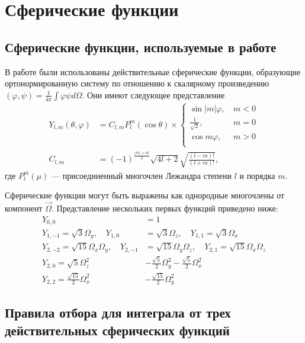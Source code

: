 \chapter{Сферические функции}
\label{chap:spher}

\section{Сферические функции, используемые в работе}

В работе были использованы действительные сферические функции, образующие ортонормированную систему по отношению
к скалярному произведению $(\varphi, \psi) = \frac{1}{4\pi} \int \varphi \psi d\Omega$. Они имеют следующее представление
\begin{align*}
Y_{l,m}(\theta, \varphi) &= C_{l,m}P_l^{m}(\cos \theta)\times
\begin{cases}
\sin |m| \varphi,&\, m<0\\
\frac{1}{\sqrt{2}},&\, m=0\\
\cos m \varphi,&\, m>0\\
\end{cases}
\label{eq:sphfunc}\\
C_{l,m} &= (-1)^{\frac{|m|+m}{2}}\sqrt{4l+2}\sqrt{\frac{(l-m)!}{(l+m)!}},
\end{align*}
где $P^m_l(\mu)$ --- присоединенный многочлен Лежандра степени $l$ и порядка $m$.

Сферические функции могут быть выражены как однородные многочлены от компонент $\vec \Omega$. Представление нескольких первых 
функций приведено ниже:
\begin{align*}
Y_{0,0} &= 1\\
Y_{1,-1} = \sqrt{3}\Omega_y,\quad
Y_{1,0} &= \sqrt{3}\Omega_z,\quad
Y_{1,1} = \sqrt{3}\Omega_x\\
Y_{2,-2} = \sqrt{15}\Omega_x\Omega_y,\quad
Y_{2,-1} &= \sqrt{15}\Omega_y\Omega_z, \quad
Y_{2,1} = \sqrt{15}\Omega_x\Omega_z\\
Y_{2,0} = \sqrt{5}\Omega_z^{2}&-\frac{\sqrt{5}}{2}\Omega_y^{2}-\frac{\sqrt{5}}{2}\Omega_x^{2}\\
Y_{2,2} = \frac{\sqrt{15}}{2}\Omega_x^{2}&-\frac{\sqrt{15}}{2}\Omega_y^{2}
\end{align*}

\section{Правила отбора для интеграла от трех действительных сферических функций}
\label{sec:select}

